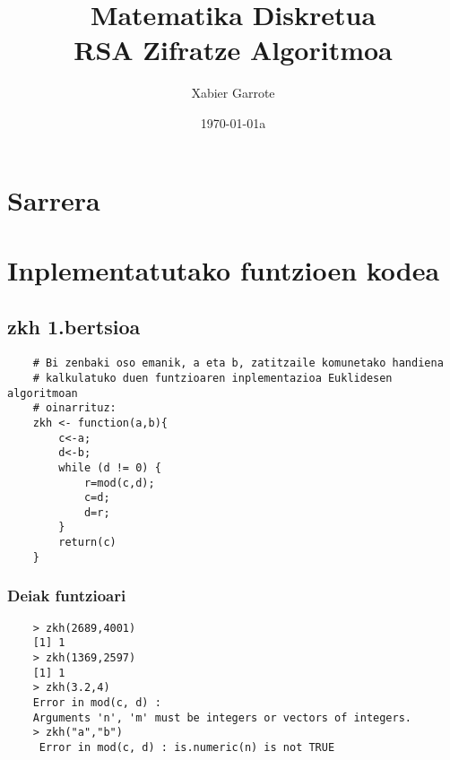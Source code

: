 \documentclass[12pt]{basque-book}
\begin{document}
\title{ \textbf{Matematika Diskretua\\ RSA Zifratze Algoritmoa} }

\author{Xabier Garrote}

\date{\today a}


\maketitle
\newpage
\tableofcontents
\newpage


\chapter{Sarrera}




\chapter{Inplementatutako funtzioen kodea}
\section{zkh 1.bertsioa}
\begin{verbatim}
    # Bi zenbaki oso emanik, a eta b, zatitzaile komunetako handiena 
    # kalkulatuko duen funtzioaren inplementazioa Euklidesen algoritmoan
    # oinarrituz:
    zkh <- function(a,b){ 
        c<-a;
        d<-b;
        while (d != 0) {
            r=mod(c,d);
            c=d;
            d=r;
        }
        return(c)  
    }
\end{verbatim}

\newpage
\subsection{Deiak funtzioari}
\begin{verbatim}
    > zkh(2689,4001)
    [1] 1
    > zkh(1369,2597)
    [1] 1
    > zkh(3.2,4)
    Error in mod(c, d) : 
    Arguments 'n', 'm' must be integers or vectors of integers. 
    > zkh("a","b")
     Error in mod(c, d) : is.numeric(n) is not TRUE 
\end{verbatim}

\newpage
\end{document}
